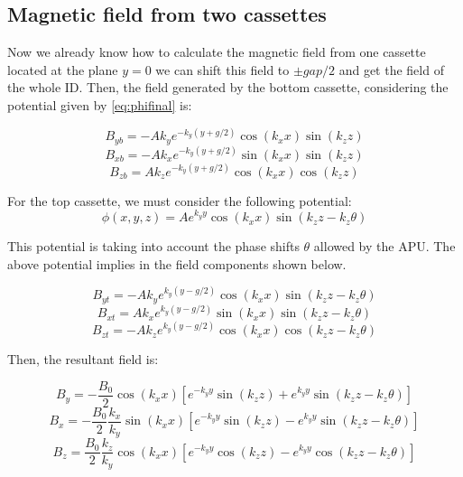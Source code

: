 \documentclass{article}
\begin{document}
\subsection{Magnetic field from two cassettes}
Now we already know how to calculate the magnetic field from one cassette located at the plane $y=0$ we can shift this field to $\pm gap/2$ and get the field of the whole ID. Then, the field generated  by the bottom cassette, considering the potential given by \ref{eq:phifinal} is:

\begin{equation}
B_{yb} = -Ak_ye^{-k_y\left(y + g/2\right)}\cos(k_xx)\sin(k_zz)
\end{equation}
\begin{equation}
B_{xb} = -Ak_xe^{-k_y\left(y + g/2\right)}\sin(k_xx)\sin(k_zz)
\end{equation}
\begin{equation}
B_{zb} = Ak_ze^{-k_y\left(y + g/2\right)}\cos(k_xx)\cos(k_zz)
\end{equation}

For the top cassette, we must consider the following potential:
\begin{equation}
\phi(x, y, z) = Ae^{k_yy}\cos{\left(k_xx\right)}\sin{\left(k_zz -k_z\theta\right)}
\label{eq:phitop}
\end{equation}

This potential is taking into account the phase shifts $\theta$ allowed by the APU. The above potential implies in the field components shown below.

\begin{equation}
B_{yt} = -Ak_ye^{k_y\left(y - g/2\right)}\cos(k_xx)\sin(k_zz-k_z\theta)
\end{equation}
\begin{equation}
B_{xt} = Ak_xe^{k_y\left(y - g/2\right)}\sin(k_xx)\sin(k_zz-k_z\theta)
\end{equation}
\begin{equation}
B_{zt} = -Ak_ze^{k_y\left(y - g/2\right)}\cos(k_xx)\cos(k_zz-k_z\theta)
\end{equation}

Then, the resultant field is:

\begin{equation}
B_{y} = -\frac{B_0}{2}\cos(k_xx)\left[e^{-k_yy}\sin(k_zz) + e^{k_yy}\sin(k_zz -k_z\theta)\right]
\label{eq:by}
\end{equation}
\begin{equation}
B_{x} = -\frac{B_0}{2}\frac{k_x}{k_y}\sin(k_xx)\left[e^{-k_yy}\sin(k_zz) - e^{k_yy}\sin(k_zz -k_z\theta)\right]
\label{eq:bx}
\end{equation}
\begin{equation}
B_{z} = \frac{B_0}{2}\frac{k_z}{k_y}\cos(k_xx)\left[e^{-k_yy}\cos(k_zz) - e^{k_yy}\cos(k_zz -k_z\theta)\right]
\end{equation}
\end{document}
